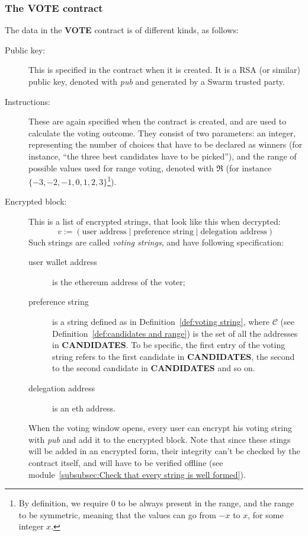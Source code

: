 \documentclass[submission, copyright,creativecommons,sharealike,noncommercial]{eptcs}
\newcommand{\candidates}{\ensuremath{\mathcal{C}} \xspace}
\newcommand{\range}{\ensuremath{\mathfrak{R}}\xspace}
\newcommand{\Candidates}{\textbf{CANDIDATES}\xspace}
\newcommand{\Vote}{\textbf{VOTE}\xspace}
\begin{document}
\subsubsection{The \Vote contract}
	The data in the \Vote contract is of different kinds, as follows:
	\begin{description}
		\item[Public key:] This is specified in the contract when it is created. It is a RSA (or similar) public key, denoted with \emph{pub} and generated by a Swarm trusted party.
			
		\item[Instructions:] These are again specified when the contract is created, and are used to calculate the voting outcome. They consist of two parameters: an integer, representing the number of choices that have to be declared as winners (for instance, ``the three best candidates have to be picked''), and the range of possible values used for range voting, denoted with $\range$ (for instance $\{-3,-2,-1,0,1,2,3\}$\footnote{By definition, we require $0$ to be always present in the range, and the range to be symmetric, meaning that the values can go from $-x$ to $x$, for some integer $x$.}).
		\item[Encrypted block:] This is a list of encrypted strings, that look like this when decrypted:
		\[
		v := (\text{user address} \mid \text{preference string} \mid \text{delegation address})
		\]
		Such strings are called \emph{voting strings}, and have following specification:
		\begin{description}
			\item[user wallet address] is the ethereum address of the voter;
			\item[preference string] is a string defined as in Definition~\ref{def:voting string}, where $\candidates$ (see Definition~\ref{def:candidates and range}) is the set of all the addresses in \Candidates. To be specific, the first entry of the voting string refers to the first candidate in \Candidates, the second to the second candidate in \Candidates and so on.
			\item[delegation address] is an eth address.
		\end{description}
		When the voting window opens, every user can encrypt his voting string with \emph{pub} and add it to the encrypted block.
		Note that since these stings will be added in an encrypted form, their integrity can't be checked by the contract itself, and will have to be verified offline (see module~\ref{subsubsec:Check that every string is well formed}).
		

\end{description}
\end{document}
